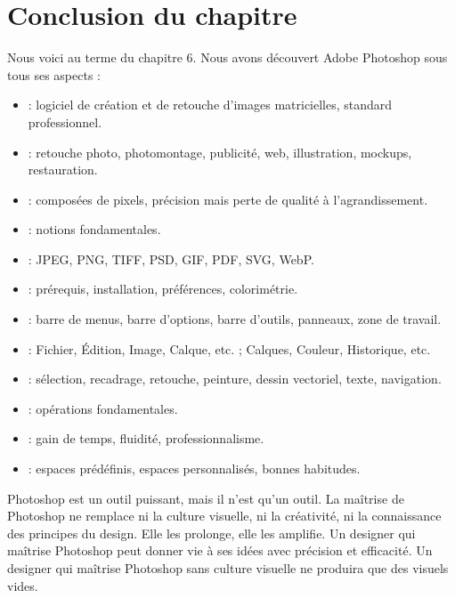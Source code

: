 \section*{Conclusion du chapitre}

Nous voici au terme du chapitre 6. Nous avons découvert Adobe Photoshop sous tous ses aspects :

\begin{itemize}
    \item {} : logiciel de création et de retouche d'images matricielles, standard professionnel.
    \item {} : retouche photo, photomontage, publicité, web, illustration, mockups, restauration.
    \item {} : composées de pixels, précision mais perte de qualité à l'agrandissement.
    \item {} : notions fondamentales.
    \item {} : JPEG, PNG, TIFF, PSD, GIF, PDF, SVG, WebP.
    \item {} : prérequis, installation, préférences, colorimétrie.
    \item {} : barre de menus, barre d'options, barre d'outils, panneaux, zone de travail.
    \item {} : Fichier, Édition, Image, Calque, etc. ; Calques, Couleur, Historique, etc.
    \item {} : sélection, recadrage, retouche, peinture, dessin vectoriel, texte, navigation.
    \item {} : opérations fondamentales.
    \item {} : gain de temps, fluidité, professionnalisme.
    \item {} : espaces prédéfinis, espaces personnalisés, bonnes habitudes.
\end{itemize}

Photoshop est un outil puissant, mais il n'est qu'un outil. La maîtrise de Photoshop ne remplace ni la culture visuelle, ni la créativité, ni la connaissance des principes du design. Elle les prolonge, elle les amplifie. Un designer qui maîtrise Photoshop peut donner vie à ses idées avec précision et efficacité. Un designer qui maîtrise Photoshop sans culture visuelle ne produira que des visuels vides.

